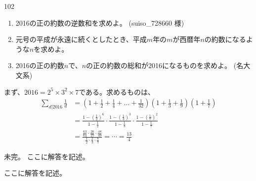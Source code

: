 \begin{thm}{102}{}{}
 \begin{enumerate}
  \item 2016の正の約数の逆数和を求めよ。  (suiso\_728660 様)
  \item 元号の平成が永遠に続くとしたとき、平成$m$年の$m$が西暦年$n$の約数になるような$n$を求めよ。 
  \item 2016の正の約数$n$で、$n$の正の約数の総和が2016になるものを求めよ。  (名大 文系)
 \end{enumerate}
\end{thm}

まず、$2016=2^5\times 3^2\times 7$である。求めるものは、
\begin{align*}
 \sum_{d|2016} \frac{1}{d} &= \left(1+\frac{1}{2}+\frac{1}{4}+\dots +\frac{1}{32}\right)\left(1+\frac{1}{3}+\frac{1}{9}\right)\left(1+\frac{1}{7}\right) \\
 &= \frac{1-\left(\frac{1}{2}\right)^6}{1-\frac{1}{2}}\cdot\frac{1-\left(\frac{1}{3}\right)^3}{1-\frac{1}{3}}\cdot\frac{1-\left(\frac{1}{7}\right)^2}{1-\frac{1}{7}} \\
 &= \frac{\frac{63}{64}\cdot\frac{26}{27}\cdot\frac{48}{49}}{\frac{1}{2}\cdot\frac{2}{3}\cdot\frac{6}{7}}=\cdots=\frac{13}{4}
\end{align*}

未完。
ここに解答を記述。

ここに解答を記述。
